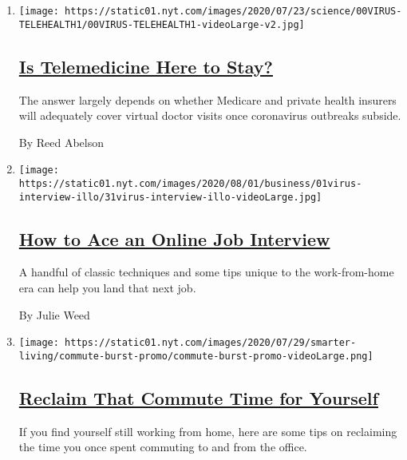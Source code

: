 \begin{enumerate}
\def\labelenumi{\arabic{enumi}.}
\item
  \texttt{[image: https://static01.nyt.com/images/2020/07/23/science/00VIRUS-TELEHEALTH1/00VIRUS-TELEHEALTH1-videoLarge-v2.jpg]}

  \hypertarget{is-telemedicine-here-to-stay}{%
  \subsection{\texorpdfstring{\href{/2020/08/03/health/covid-telemedicine-congress.html}{Is
  Telemedicine Here to
  Stay?}}{Is Telemedicine Here to Stay?}}\label{is-telemedicine-here-to-stay}}

  The answer largely depends on whether Medicare and private health
  insurers will adequately cover virtual doctor visits once coronavirus
  outbreaks subside.

  By Reed Abelson
\item
  \texttt{[image: https://static01.nyt.com/images/2020/08/01/business/01virus-interview-illo/31virus-interview-illo-videoLarge.jpg]}

  \hypertarget{how-to-ace-an-online-job-interview}{%
  \subsection{\texorpdfstring{\href{/2020/08/03/business/online-job-interview-tips.html}{How
  to Ace an Online Job
  Interview}}{How to Ace an Online Job Interview}}\label{how-to-ace-an-online-job-interview}}

  A handful of classic techniques and some tips unique to the
  work-from-home era can help you land that next job.

  By Julie Weed
\item
  \texttt{[image: https://static01.nyt.com/images/2020/07/29/smarter-living/commute-burst-promo/commute-burst-promo-videoLarge.png]}

  \hypertarget{reclaim-that-commute-time-for-yourself}{%
  \subsection{\texorpdfstring{\href{/interactive/2020/08/03/burst/reclaim-commute-time.html}{Reclaim
  That Commute Time for
  Yourself}}{Reclaim That Commute Time for Yourself}}\label{reclaim-that-commute-time-for-yourself}}

  If you find yourself still working from home, here are some tips on
  reclaiming the time you once spent commuting to and from the office.


\end{enumerate}
